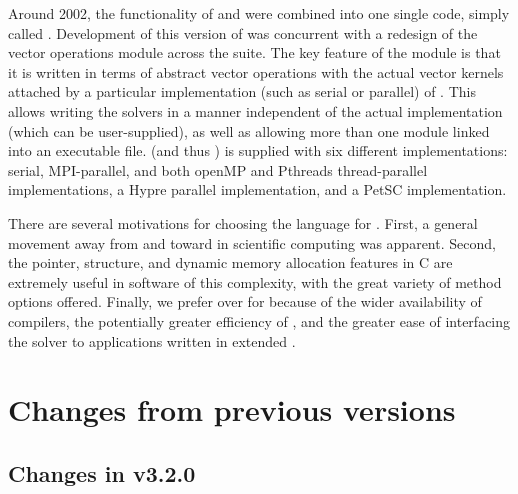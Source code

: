  Around 2002,
the functionality of {\cvode} and {\pvode} were combined into one
single code, simply called {\cvode}. Development of this version of
{\cvode} was concurrent with a redesign of the vector operations
module across the {\sundials} suite. The key feature of the
{\nvector} module is that it is written in terms of abstract vector
operations with the actual vector kernels attached by a particular
implementation (such as serial or parallel) of {\nvector}. This allows
writing the {\sundials} solvers in a manner independent of the actual
{\nvector} implementation (which can be user-supplied), as well as
allowing more than one {\nvector} module linked into an executable file.
{\sundials} (and thus {\cvode}) is supplied with six different {\nvector}
implementations:
serial, MPI-parallel, and both openMP and Pthreads thread-parallel
{\nvector} implementations, a Hypre parallel implementation,
and a PetSC implementation.

There are several motivations for choosing the {\CC} language for {\cvode}.
First, a general movement away from {\F} and toward {\CC} in scientific
computing was apparent.  Second, the pointer, structure, and dynamic
memory allocation features in C are extremely useful in software of
this complexity, with the great variety of method options offered.
Finally, we prefer {\CC} over {\CPP} for {\cvode} because of the wider
availability of {\CC} compilers, the potentially greater efficiency of {\CC},
and the greater ease of interfacing the solver to applications written
in extended {\F}.

\section{Changes from previous versions}

\subsection*{Changes in v3.2.0}


